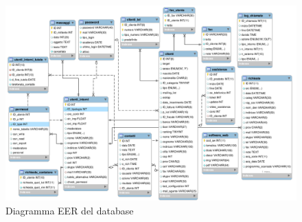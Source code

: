 \begin{figure}[!ht]
\centering
  \includegraphics[scale=0.5]{./images/database.png}
\caption{Diagramma EER del database}
\label{EER}
\end{figure}

